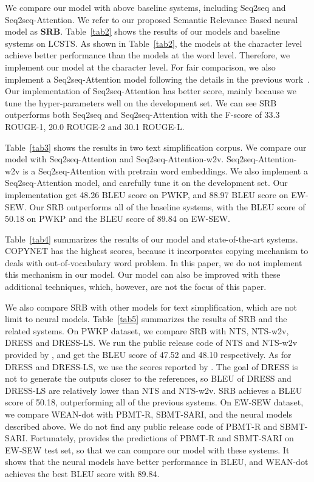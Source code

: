 \documentclass{clv3}
\begin{document}
\begin{CJK*}{UTF8}{gbsn}
We compare our model with above baseline systems, including Seq2seq and Seq2seq-Attention. We refer to our proposed Semantic Relevance Based neural model as \textbf{SRB}. Table~\ref{tab2} shows the results of our models and baseline systems on LCSTS. As shown in Table~\ref{tab2}, the models at the character level achieve better performance than the models at the word level. Therefore, we implement our model at the character level. For fair comparison, we also implement a Seq2seq-Attention model following the details in the previous work~\cite{lcsts}. Our implementation of Seq2seq-Attention has better score, mainly because we tune the hyper-parameters well on the development set.
We can see SRB outperforms both Seq2seq and Seq2seq-Attention with the F-score of 33.3 ROUGE-1, 20.0 ROUGE-2 and 30.1 ROUGE-L. 

Table~\ref{tab3} shows the results in two text simplification corpus. We compare our model with Seq2seq-Attention and Seq2seq-Attention-w2v. Seq2seq-Attention-w2v is a Seq2seq-Attention with pretrain word embeddings. We also implement a Seq2seq-Attention model, and carefully tune it on the development set. Our implementation get 48.26 BLEU score on PWKP, and 88.97 BLEU score on EW-SEW. Our SRB outperforms all of the baseline systems, with the BLEU score of 50.18 on PWKP and the BLEU score of 89.84 on EW-SEW. 

Table~\ref{tab4} summarizes the results of our model and state-of-the-art systems. COPYNET has the highest scores, because it incorporates copying mechanism to deals with out-of-vocabulary word problem.
In this paper, we do not implement this mechanism in our model.
Our model can also be improved with these additional
techniques, which, however, are not the focus of this
paper.

We also compare SRB with other models for text simplification, which are not limit to neural models. Table~\ref{tab5} summarizes the results of SRB and the related systems. On PWKP dataset, we compare SRB with NTS, NTS-w2v, DRESS and DRESS-LS. We run the public release code of NTS and NTS-w2v provided by , and get the BLEU score of 47.52 and 48.10 respectively. As for DRESS and DRESS-LS, we use the scores reported by . 
The goal of DRESS is not to generate the outputs closer to the references, so BLEU of DRESS and DRESS-LS are relatively lower than NTS and NTS-w2v. SRB achieves a BLEU score of 50.18, outperforming all of the previous systems. On EW-SEW dataset, we compare WEAN-dot with PBMT-R, SBMT-SARI, and the neural models described above. We do not find any public release code of PBMT-R and SBMT-SARI. Fortunately,  provides the predictions of PBMT-R and SBMT-SARI on EW-SEW test set, so that we can compare our model with these systems. It shows that the neural models have better performance in BLEU, and WEAN-dot achieves the best BLEU score with 89.84.



\end{CJK*}
\end{document}
